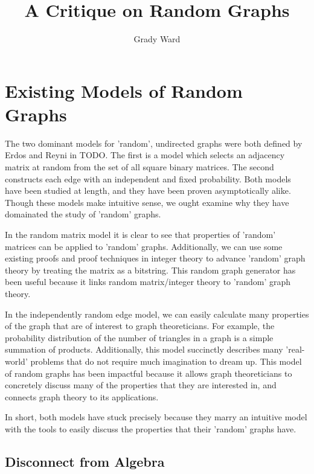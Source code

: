 \documentclass[a4paper,12pt]{article}
\begin{document}
\lstset{language=Python}

\title{A Critique on Random Graphs}

\author{Grady Ward}

\maketitle

\section*{Existing Models of Random Graphs}

The two dominant models for 'random', undirected graphs were both defined by Erdos and Reyni in TODO.
The first is a model which selects an adjacency matrix at random from the set of all square binary matrices.
The second constructs each edge with an independent and fixed probability. 
Both models have been studied at length, and they have been proven asymptotically alike. 
Though these models make intuitive sense, we ought examine why they have domainated the study of 'random' graphs.

In the random matrix model it is clear to see that properties of 'random' matrices can be applied to 'random' graphs.
Additionally, we can use some existing proofs and proof techniques in integer theory to advance 'random' graph theory by treating the matrix as a bitstring. 
This random graph generator has been useful because it links random matrix/integer theory to 'random' graph theory.

In the independently random edge model, we can easily calculate many properties of the graph that are of interest to graph theoreticians.
For example, the probability distribution of the number of triangles in a graph is a simple summation of products.
Additionally, this model succinctly describes many 'real-world' problems that do not require much imagination to dream up.
This model of random graphs has been impactful because it allows graph theoreticians to concretely discuss many of the properties that they are interested in, and connects graph theory to its applications.

In short, both models have stuck precisely because they marry an intuitive model with the tools to easily discuss the properties that their 'random' graphs have.

\subsection*{Disconnect from Algebra}
\end{document}
